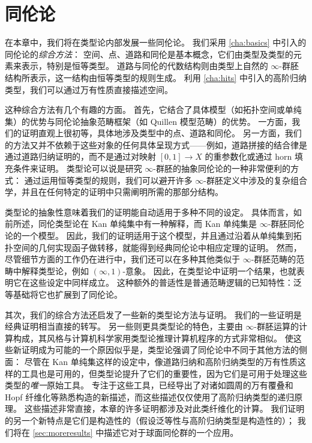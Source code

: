 \chapter{同伦论}
\label{cha:homotopy}


在本章中，我们将在类型论内部发展一些同伦论。
我们采用 \cref{cha:basics} 中引入的同伦论的\emph{综合方法}：
空间、点、道路和同伦是基本概念，它们由类型及类型的元素来表示，特别是恒等类型。
道路与同伦的代数结构则由类型上自然的 $\infty$-群胚
%
结构所表示，这一结构由恒等类型的规则生成。
利用 \cref{cha:hits} 中引入的高阶归纳类型，我们可以通过万有性质直接描述空间。

%
这种综合方法有几个有趣的方面。
首先，它结合了具体模型（如拓扑空间或单纯集）的优势与同伦论抽象范畴框架（如 Quillen 模型范畴）的优势。
一方面，我们的证明直观上很初等，具体地涉及类型中的点、道路和同伦。
另一方面，我们的方法又并不依赖于这些对象的任何具体呈现方式——例如，道路拼接的结合律是通过道路归纳证明的，而不是通过对映射 $[0,1] \to X$ 的重参数化或通过 horn 填充条件来证明。
类型论可以说是研究 $\infty$-群胚的抽象同伦论的一种非常便利的方式：
通过运用恒等类型的规则，我们可以避开许多 $\infty$-群胚定义中涉及的复杂组合学，并且在任何特定的证明中只需阐明所需的那部分结构。

类型论的抽象性意味着我们的证明能自动适用于多种不同的设定。
具体而言，如前所述，同伦类型论在 Kan 单纯集中有一种解释，而 Kan 单纯集是 $\infty$-群胚同伦论的一个模型。
因此，我们的证明适用于这个模型，并且通过沿着从单纯集到拓扑空间的几何实现函子做转移，就能得到经典同伦论中相应定理的证明。
然而，尽管细节方面的工作仍在进行中，我们还可以在多种其他类似于 $\infty$-群胚范畴的范畴中解释类型论，例如 $(\infty,1)$-意象。
因此，在类型论中证明一个结果，也就表明它在这些设定中同样成立。
这种额外的普适性是普通范畴逻辑的已知特性：泛等基础将它也扩展到了同伦论。

其次，我们的综合方法还启发了一些新的类型论方法与证明。
我们的一些证明是经典证明相当直接的转写。
另一些则更具类型论的特色，主要由 $\infty$-群胚运算的计算构成，其风格与计算机科学家用类型论推理计算机程序的方式非常相似。
使这些新证明成为可能的一个原因似乎是，类型论强调了同伦论中不同于其他方法的侧面：
尽管在 Kan 单纯集这样的设定中，像道路归纳和高阶归纳类型的万有性质这样的工具也是可用的，但类型论提升了它们的重要性，因为它们是可用于处理这些类型的\emph{唯一}原始工具。
专注于这些工具，已经导出了对诸如圆周的万有覆叠和 Hopf 纤维化等熟悉构造的新描述，而这些描述仅仅使用了高阶归纳类型的递归原理。
这些描述非常直接，本章的许多证明都涉及对此类纤维化的计算。
%
我们证明的另一个新特点是它们是构造性的（假设泛等性与高阶归纳类型是构造性的）；
我们将在 \cref{sec:moreresults} 中描述它对于球面同伦群的一个应用。

